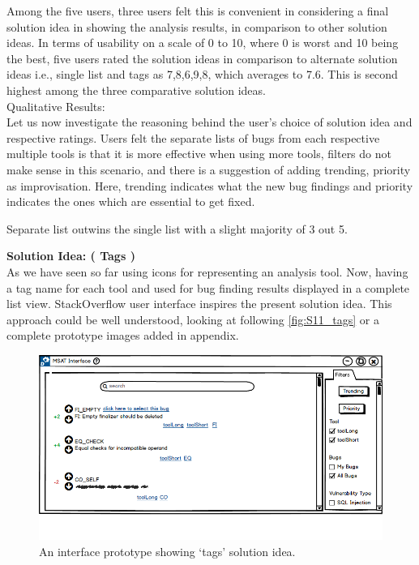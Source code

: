Among the five users, three users felt this is convenient in considering a final solution idea in showing the analysis results, in comparison to other solution ideas.  In terms of usability on a scale of 0 to 10, where 0 is worst and 10 being the best, five users rated the solution ideas in comparison to alternate solution ideas i.e., single list and tags as 7,8,6,9,8, which averages to 7.6. This is second highest among the three comparative solution ideas. \\


Qualitative Results: \\

Let us now investigate the reasoning behind the user’s choice of solution idea and respective ratings. Users felt the separate lists of bugs from each respective multiple tools is that it is more effective when using more tools, filters do not make sense in this scenario, and there is a suggestion of adding trending, priority as improvisation. Here, trending indicates what the new bug findings and priority indicates the ones which are essential to get fixed. \\

\begin{myboxi}
	Separate list outwins the single list with a slight majority of 3 out 5. \\
\end{myboxi}


\textbf{Solution Idea: ( Tags )} \\

As we have seen so far using icons for representing an analysis tool. Now, having a tag name for each tool and used for bug finding results displayed in a complete list view. StackOverflow user interface inspires the present solution idea. This approach could be well understood, looking at following \autoref{fig:S11_tags} or a complete prototype images added in appendix. 
\\

\begin{figure}[hbt!]
	\centering
	\includegraphics[width=\linewidth]{figures/solution_ideas_snaps/S11_tags}
	\caption{An interface prototype showing ‘tags’ solution idea.}
	\label{fig:S11_tags}
\end{figure}

